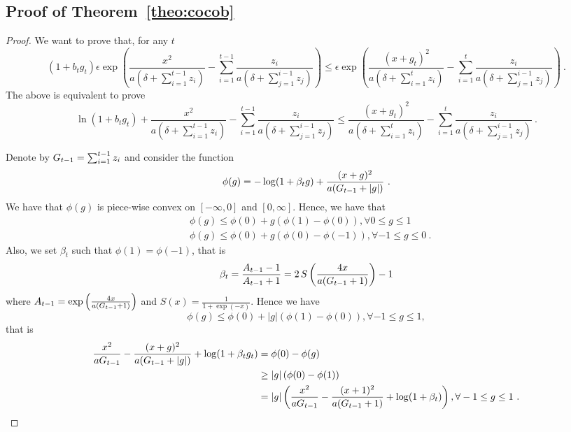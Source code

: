 \subsection{Proof of Theorem~\ref{theo:cocob}}
\begin{proof}
We want to prove that, for any $t$
\[
(1+b_t g_t) \epsilon \exp\left(\frac{x^2}{a (\delta+\sum_{i=1}^{t-1} z_i)}- \sum_{i=1}^{t-1} \frac{z_i}{a (\delta+\sum_{j=1}^{i-1} z_j)}\right)
\leq \epsilon \exp\left(\frac{(x+g_t)^2}{a (\delta+\sum_{i=1}^{t} z_i)}- \sum_{i=1}^{t} \frac{z_i}{a (\delta+\sum_{j=1}^{i-1} z_j)}\right)~.
\]
The above is equivalent to prove
\[
\ln(1+b_t g_t) + \frac{x^2}{a (\delta+\sum_{i=1}^{t-1} z_i)}- \sum_{i=1}^{t-1} \frac{z_i}{a (\delta+\sum_{j=1}^{i-1} z_j)}
\leq \frac{(x+g_t)^2}{a (\delta+\sum_{i=1}^{t} z_i)}- \sum_{i=1}^{t} \frac{z_i}{a (\delta+\sum_{j=1}^{i-1} z_j)}~.
\]

Denote by $G_{t-1}=\sum_{i=1}^{t-1} z_i$ and consider the function 
\[
\phi(g)=-\log(1+\beta_t g) + \frac{(x+g)^2}{a (G_{t-1} + |g|)}~.
\]
We have that $\phi(g)$ is piece-wise convex on $[-\infty,0]$ and $[0,\infty]$. Hence, we have that
\begin{align*}
&\phi(g) \leq \phi(0)+g (\phi(1)-\phi(0)), \forall 0 \leq g\leq 1\\
&\phi(g) \leq \phi(0)+g (\phi(0)-\phi(-1)), \forall -1 \leq g\leq 0~.
\end{align*}
Also, we set $\beta_t$ such that $\phi(1)=\phi(-1)$, that is
\[
\beta_t = \frac{A_{t-1}-1}{A_{t-1}+1} 
= 2 \, S\left(\frac{4 x}{a (G_{t-1} + 1)}\right)-1
\]
where $A_{t-1}=\exp\left(\frac{4 x}{a (G_{t-1} + 1)}\right)$ and
$S(x) =\frac{1}{1+\exp(-x)}$.
Hence we have
\[
\phi(g) \leq \phi(0)+ |g| (\phi(1)-\phi(0)), \forall -1 \leq g\leq 1,
\]
that is
\begin{align*}
\frac{x^2}{a G_{t-1}}-\frac{(x+g)^2}{a (G_{t-1} +  |g|)} + \log(1+\beta_t g_t) 
& = \phi(0) - \phi(g) \\
& \geq |g| \left(\phi(0) - \phi(1)\right) \\
&= |g| \left(\frac{x^2}{a G_{t-1}} - \frac{(x+1)^2}{a (G_{t-1} + 1)} + \log(1+\beta_t)\right), \forall -1 \leq g\leq 1~.
\end{align*}


\end{proof}
